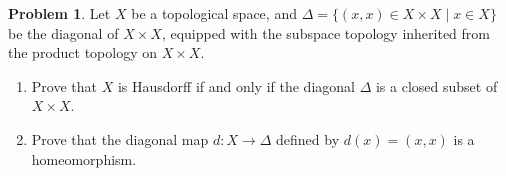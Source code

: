 \documentclass[11pt, a4paper]{article}
\theoremstyle{definition}
\newtheorem{problem}{Problem}
\begin{document}
\begin{problem}
Let $X$ be a topological space, and $\Delta = \{(x,x) \in X \times X \mid x \in X\}$ be the diagonal of $X \times X$, equipped with the subspace topology inherited from the product topology on $X \times X$.
\begin{enumerate}[label=(\roman*)]
    \item Prove that $X$ is Hausdorff if and only if the diagonal $\Delta$ is a closed subset of $X \times X$.
    \item Prove that the diagonal map $d : X \longrightarrow \Delta$ defined by $d(x) = (x,x)$ is a homeomorphism.
\end{enumerate}
\end{problem}
\end{document}
